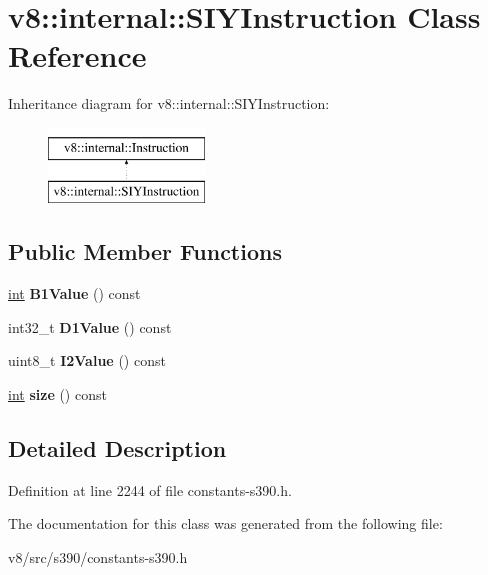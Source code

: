 \hypertarget{classv8_1_1internal_1_1SIYInstruction}{}\section{v8\+:\+:internal\+:\+:S\+I\+Y\+Instruction Class Reference}
\label{classv8_1_1internal_1_1SIYInstruction}
Inheritance diagram for v8\+:\+:internal\+:\+:S\+I\+Y\+Instruction\+:\begin{figure}[H]
\begin{center}
\leavevmode
\includegraphics[height=2.000000cm]{classv8_1_1internal_1_1SIYInstruction}
\end{center}
\end{figure}
\subsection*{Public Member Functions}
\begin{DoxyCompactItemize}
\item 
\mbox{\label{classv8_1_1internal_1_1SIYInstruction_a203f04ba91159b11c5176020de36119d}} 
\mbox{\hyperlink{classint}{int}} {\bfseries B1\+Value} () const
\item 
\mbox{\label{classv8_1_1internal_1_1SIYInstruction_a26d8e826e8f0b00c148fbeff65c32939}} 
int32\+\_\+t {\bfseries D1\+Value} () const
\item 
\mbox{\label{classv8_1_1internal_1_1SIYInstruction_af6730b803d5eab823cd4b40121b08ba7}} 
uint8\+\_\+t {\bfseries I2\+Value} () const
\item 
\mbox{\label{classv8_1_1internal_1_1SIYInstruction_aecfe00b46e51ce260d5ccd6879cf6d48}} 
\mbox{\hyperlink{classint}{int}} {\bfseries size} () const
\end{DoxyCompactItemize}


\subsection{Detailed Description}


Definition at line 2244 of file constants-\/s390.\+h.



The documentation for this class was generated from the following file\+:\begin{DoxyCompactItemize}
\item 
v8/src/s390/constants-\/s390.\+h\end{DoxyCompactItemize}
